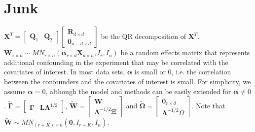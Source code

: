 \documentclass{article}
\begin{document}
\section{Junk}
$\bm{X}^T = \left[ \begin{matrix}
\bm{Q}_1 & \bm{Q}_2
\end{matrix} \right]\left[ \begin{matrix}
\bm{R}_{d \times d}\\
\bm{0}_{n-d \times d}
\end{matrix} \right]$ be the QR decomposition of $\bm{X}^T$. $\bm{W}_{r \times n} \sim MN_{r \times n}\left( \bm{\alpha}_{r \times d}\bm{X}_{d \times n}, I_{r}, I_{n} \right)$ be a random effects matrix that represents additional confounding in the experiment that may be correlated with the covariates of interest. In most data sets, $\bm{\alpha}$ is small or 0, i.e. the correlation between the confounders and the covariates of interest is small. For simplicity, we assume $\bm{\alpha}=0$, although the model and methods can be easily extended for $\bm{\alpha} \neq 0$. $\bm{\tilde{\Gamma}} = \left[ \begin{matrix}
\bm{\Gamma} & \bm{L} \bm{\Lambda}^{1/2}
\end{matrix} \right]$, $\bm{\tilde{W}} = \left[ \begin{matrix}
\bm{W}\\
\bm{\Lambda}^{-1/2}\bm{\Xi}
\end{matrix} \right]$ and $\bm{\tilde{\Omega}} = \left[ \begin{matrix}
\bm{0}_{r \times d}\\
\bm{\Lambda}^{-1/2} \Omega
\end{matrix} \right]$. Note that $\bm{\tilde{W}} \sim MN_{\left( r+K \right)\times n}\left( \bm{0}, I_{r+K}, I_n \right)$.
\end{document}
